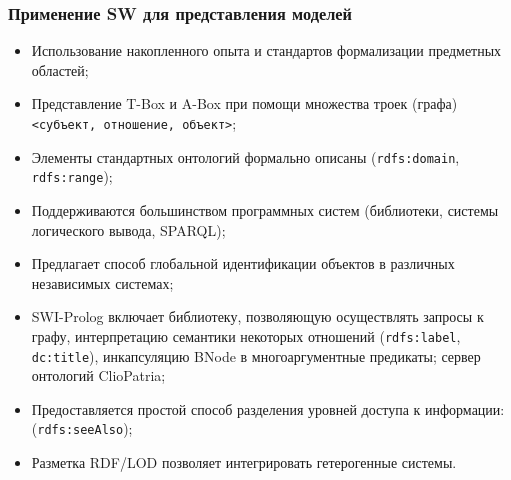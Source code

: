 \documentclass[10pt]{beamer}
\begin{document}
\begin{frame}[fragile]
  \frametitle{Применение SW для представления моделей}
  \begin{itemize}
  \item Использование накопленного опыта и стандартов формализации предметных областей;
  \item Представление T-Box и A-Box при помощи множества троек (графа) \texttt{<субъект, отношение, объект>};
  \item Элементы стандартных онтологий формально описаны (\verb|rdfs:domain|, \verb|rdfs:range|);
  \item Поддерживаются большинством программных систем (библиотеки, системы логического вывода, SPARQL);
  \item Предлагает способ глобальной идентификации объектов в различных независимых системах;
  \item SWI-Prolog включает библиотеку, позволяющую осуществлять запросы к графу, интерпретацию семантики некоторых отношений (\verb|rdfs:label|, \verb|dc:title|), инкапсуляцию BNode в многоаргументные предикаты; сервер онтологий ClioPatria;
  \item Предоставляется простой способ разделения уровней доступа к информации: (\verb|rdfs:seeAlso|);
  \item Разметка RDF/LOD позволяет интегрировать гетерогенные системы.
  \end{itemize}
\end{frame}
\end{document}
